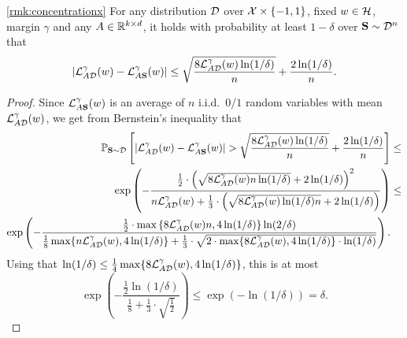 \begin{customrmk}{\ref{rmk:concentrationx}}
For any distribution $\mathcal{D}$ over $\mathcal{X} \times \{-1,1\}$, fixed $w \in \mathcal{H}$, margin $\gamma$ and any $A \in \mathbb{R}^{k \times d}$, it holds with probability at least $1-\delta$ over $\mathbf{S} \sim \mathcal{D}^n$ that
\[
|\mathcal{L}_{A\mathcal{D}}^{\gamma}(w) - \mathcal{L}_{A\mathbf{S}}^{\gamma}(w)| \leq \sqrt{\frac{8\mathcal{L}_{A \mathcal{D}}^{\gamma}(w)\ln(1/\delta)}{n}} + \frac{2 \ln(1/\delta)}{n}.
\]
\end{customrmk}
\begin{proof}
Since $\mathcal{L}^\gamma_{A \mathbf{S}}(w)$ is an average of $n$ i.i.d.\ $0/1$ random variables with mean $\mathcal{L}^\gamma_{A \mathcal{D}}(w)$, we get from Bernstein's inequality that 
\begin{align*}
    \mathbb{P}_{\mathbf{S} \sim \mathcal{D}}\left[|\mathcal{L}_{A\mathcal{D}}^{\gamma}(w) - \mathcal{L}_{A\mathbf{S}}^{\gamma}(w)| >\sqrt{\frac{8\mathcal{L}_{A \mathcal{D}}^{\gamma}(w)\ln(1/\delta)}{n}} + \frac{2 \ln(1/\delta)}{n} \right] &\leq \\
    \exp\left(- \frac{\tfrac{1}{2} \cdot \left(\sqrt{ 8\mathcal{L}_{A \mathcal{D}}^{\gamma}(w) n \ln(1/\delta) } + 2 \ln(1/\delta)\right)^2}{n \mathcal{L}_{A \mathcal{D}}^\gamma(w) + \tfrac{1}{3} \cdot \left(\sqrt{ 8\mathcal{L}_{A \mathcal{D}}^{\gamma}(w)\ln(1/\delta) n} + 2 \ln(1/\delta)\right) }\right) &\leq\\
    \exp\left(- \frac{\tfrac{1}{2} \cdot \max\left\{8\mathcal{L}_{A \mathcal{D}}^{\gamma}(w) n,  4 \ln(1/\delta)\right\} \ln(2/\delta)}{\tfrac{1}{8} \max\{n \mathcal{L}_{A \mathcal{D}}^\gamma(w), 4\ln(1/\delta)\} + \tfrac{1}{3} \cdot \sqrt{2 \cdot \max\{ 8\mathcal{L}_{A \mathcal{D}}^{\gamma}(w), 4 \ln(1/\delta)\} \cdot \ln(1/\delta)}}\right).
\end{align*}
Using that $\ln(1/\delta) \leq \tfrac{1}{4} \max\{ 8\mathcal{L}_{A \mathcal{D}}^{\gamma}(w), 4 \ln(1/\delta)\}$, this is at most
\[
    \exp\left(- \frac{\tfrac{1}{2} \ln(1/\delta)}{\tfrac{1}{8}  + \tfrac{1}{3} \cdot \sqrt{\tfrac{1}{2} }}\right) \leq \exp(-\ln(1/\delta)) = \delta.
\]
\end{proof}
